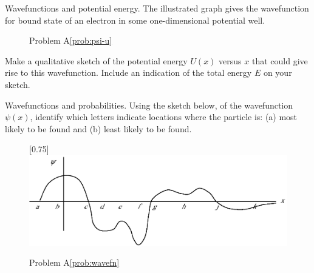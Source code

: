 \begin{aproblem}{Wavefunctions and potential energy.} 
  The illustrated graph gives the wavefunction for bound state of an
  electron in some one-dimensional potential well.

  \begin{figure}[h]
    \begin{center}
      \caption{Problem A\ref{prob:psi-u}}
    \end{center}
  \end{figure}

  Make a qualitative sketch of the potential energy $U(x)$ versus $x$
  that could give rise to this wavefunction.  Include an indication of
  the total energy $E$ on your sketch.
  \label{prob:psi-u}
\end{aproblem}
    

\begin{aproblem}{Wavefunctions and probabilities.} 
  Using the sketch below, of the wavefunction $\psi (x)$, identify
  which letters indicate locations where the particle is: (a) most
  likely to be found and (b) least likely to be
  found. \label{prob:wavefn}

  \begin{figure}[h]
    \begin{center}
      \scalebox{0.5}[0.75]{\includegraphics{additional_problems/wavefunction2}}
      \caption{Problem A\ref{prob:wavefn}}
    \end{center}
  \end{figure}
\end{aproblem}


